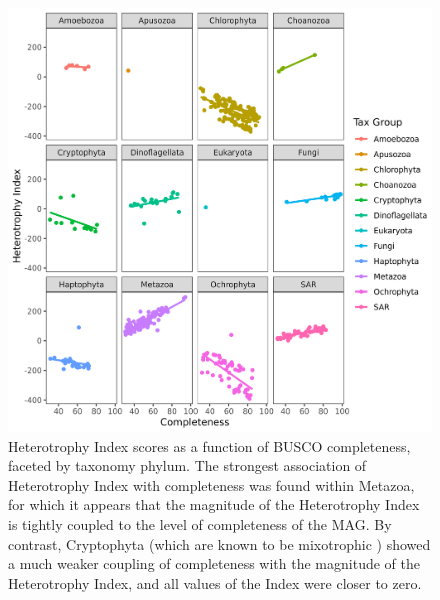 \documentclass[12pt]{article}
\numberwithin{equation}{section}
\begin{document}
\begin{figure}
    \centering
    \includegraphics[width=0.95\columnwidth]{si-figures/heterotrophyindex_group_new.png}
    \caption{Heterotrophy Index scores as a function of BUSCO completeness, faceted by taxonomy phylum. The strongest association of Heterotrophy Index with completeness was found within Metazoa, for which it appears that the magnitude of the Heterotrophy Index is tightly coupled to the level of completeness of the MAG. By contrast, Cryptophyta (which are known to be mixotrophic \citep{jones2000mixotrophy}) showed a much weaker coupling of completeness with the magnitude of the Heterotrophy Index, and all values of the Index were closer to zero.}
    \label{fig:het-ind}
\end{figure}
\end{document}
